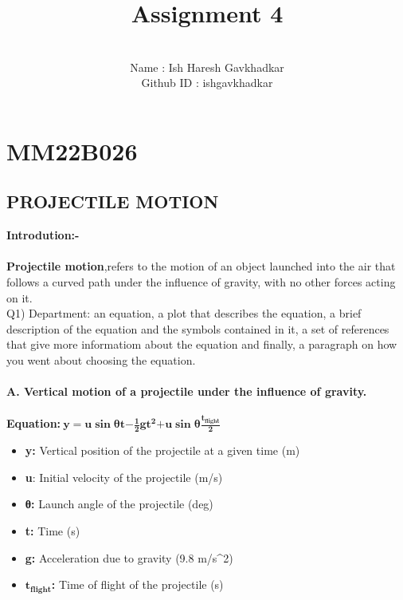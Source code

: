 \documentclass{article}
\title{Assignment 4}
\author{\\ Name : Ish Haresh Gavkhadkar \\ Github ID : ishgavkhadkar}
\date{}
\begin{document}
\maketitle
\section*{MM22B026}
\subsection*{PROJECTILE MOTION}
\textbf{Introdution:-}
\\
\\
\textbf{Projectile motion},refers to the motion of an object launched
into the air that follows a curved path under the influence of gravity,
with no other forces acting on it.
\\
Q1) Department: an equation, a plot that describes the equation, a brief
description of the equation and the symbols contained in it, a set of
references that give more informatiom about the equation and finally, a
paragraph on how you went about choosing the equation.
\\
\\
\textbf{A. Vertical motion of a projectile under the influence of gravity.}
\\
\\
\textbf{Equation:}\(\ \mathbf{y = u}\mathbf{\sin}\mathbf{\text{θt}}\mathbf{-}\frac{\mathbf{1}}{\mathbf{2}}\mathbf{g}\mathbf{t}^{\mathbf{2}}\mathbf{+ u}\mathbf{\sin}{\mathbf{\theta}\frac{\mathbf{t}_{\mathbf{\text{flight}}}}{\mathbf{2}}}\)

\begin{itemize}
\item
  \textbf{y:} Vertical position of the projectile at a given time (m)
\item
  \textbf{u}: Initial velocity of the projectile (m/s)
\item
  \textbf{θ:} Launch angle of the projectile (deg)
\item
  \textbf{t:} Time (s)
\item
  \textbf{g:} Acceleration due to gravity (9.8 m/s\^{}2)
\item
  \(\mathbf{t}_{\mathbf{\text{flight}}}\)\textbf{:} Time of flight of
  the projectile (s)
\end{itemize}
\end{document}
